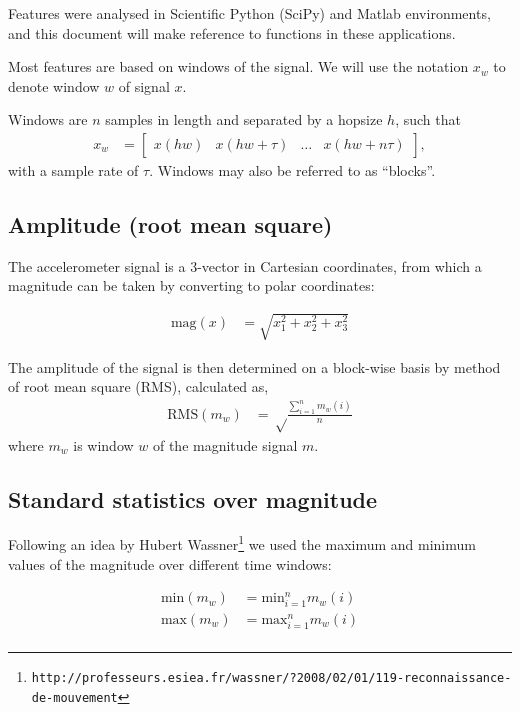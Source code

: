 \documentclass{article}
\newcommand{\url}[1]{\texttt{#1}}
\begin{document}
Features were analysed in Scientific Python (SciPy) and Matlab
environments, and this document will make reference to functions in
these applications.

Most features are based on windows of the signal.  We will use the
notation $x_w$ to denote window $w$ of signal $x$.

Windows are $n$ samples in length and separated by a hopsize $h$, such
that
\begin{align}
x_w &= \left[\begin{array}{cccc}x(hw)&x(hw+\tau)&\dots&x(hw + n\tau)\end{array}\right],
\end{align}
with a sample rate of $\tau.$
Windows may also be referred to as ``blocks''.

\subsection{Amplitude (root mean square)}

The accelerometer signal is a 3-vector in Cartesian coordinates, from
which a magnitude can be taken by converting to polar coordinates:

\begin{align}
\textrm{mag}(x) &= \sqrt{x_1^2 + x_2^2 + x_3^2}
\end{align}

The amplitude of the signal is then determined on a block-wise basis
by method of root mean square (RMS), calculated as,
\begin{align}
\textrm{RMS}(m_w) &= \sqrt\frac{\sum^n_{i=1}{m_w(i)}}{n}
\end{align}
where $m_w$ is window $w$ of the magnitude signal $m$.

\subsection{Standard statistics over magnitude}

Following an idea by Hubert Wassner\footnote{\url{http://professeurs.esiea.fr/wassner/?2008/02/01/119-reconnaissance-de-mouvement}} we used the maximum and minimum values of the magnitude over different time windows:

\begin{align}
\textrm{min}(m_w) &= \textrm{min}_{i=1}^n m_w(i)\\
\textrm{max}(m_w) &= \textrm{max}_{i=1}^n m_w(i)\\
\end{align}
\end{document}
